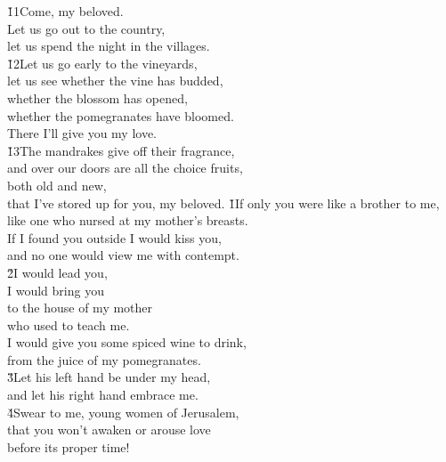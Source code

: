 \begin{poetry}
\poeml \v{11}Come, my beloved. \\
\poemll    Let us go out to the country, \\
\poemlll       let us spend the night in the villages. \\
\poeml \v{12}Let us go early to the vineyards, \\
\poemll    let us see whether the vine has budded, \\
\poeml whether the blossom has opened, \\
\poemll    whether the pomegranates have bloomed. \\
\poemlll       There I'll give you my love. \\
\poeml \v{13}The mandrakes give off their fragrance, \\
\poemll    and over our doors are all the choice fruits, \\
\poeml both old and new, \\
\poemll    that I've stored up for you, my beloved.
\poeml {}
\v{1}If only you were like a brother to me, \\
\poeml like one who nursed at my mother's breasts. \\
\poeml If I found you outside I would kiss you, \\
\poeml and no one would view me with contempt. \\
\poeml \v{2}I would lead you, \\
\poemll    I would bring you \\
\poeml to the house of my mother \\
\poemll    who used to teach me. \\
\poeml I would give you some spiced wine to drink, \\
\poemll    from the juice of my pomegranates. \\
\poeml \v{3}Let his left hand be under my head, \\
\poemll    and let his right hand embrace me. \\
\poeml \v{4}Swear to me, young women of Jerusalem, \\
\poemll    that you won't awaken or arouse love \\
\poemlll       before its proper time!

\end{poetry}
